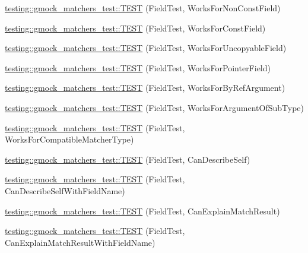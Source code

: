\begin{DoxyCompactItemize}
\item 
\mbox{\hyperlink{namespacetesting_1_1gmock__matchers__test_a57213a63527bbd66c024dd1cfafe92d1}{testing\+::gmock\+\_\+matchers\+\_\+test\+::\+T\+E\+ST}} (Field\+Test, Works\+For\+Non\+Const\+Field)
\item 
\mbox{\hyperlink{namespacetesting_1_1gmock__matchers__test_a065efc397a420d3dde87909b4a9a6285}{testing\+::gmock\+\_\+matchers\+\_\+test\+::\+T\+E\+ST}} (Field\+Test, Works\+For\+Const\+Field)
\item 
\mbox{\hyperlink{namespacetesting_1_1gmock__matchers__test_ac26d681f09865b0727ca32343d974907}{testing\+::gmock\+\_\+matchers\+\_\+test\+::\+T\+E\+ST}} (Field\+Test, Works\+For\+Uncopyable\+Field)
\item 
\mbox{\hyperlink{namespacetesting_1_1gmock__matchers__test_a56b1c75b98aaa5c9d3a6dec2d3ba30dc}{testing\+::gmock\+\_\+matchers\+\_\+test\+::\+T\+E\+ST}} (Field\+Test, Works\+For\+Pointer\+Field)
\item 
\mbox{\hyperlink{namespacetesting_1_1gmock__matchers__test_afcb890c159493e250477408a453b08d1}{testing\+::gmock\+\_\+matchers\+\_\+test\+::\+T\+E\+ST}} (Field\+Test, Works\+For\+By\+Ref\+Argument)
\item 
\mbox{\hyperlink{namespacetesting_1_1gmock__matchers__test_ae720452c3587433e26bea2ea7e91f8e6}{testing\+::gmock\+\_\+matchers\+\_\+test\+::\+T\+E\+ST}} (Field\+Test, Works\+For\+Argument\+Of\+Sub\+Type)
\item 
\mbox{\hyperlink{namespacetesting_1_1gmock__matchers__test_a27058ed7297742f08419bc5feb3ef687}{testing\+::gmock\+\_\+matchers\+\_\+test\+::\+T\+E\+ST}} (Field\+Test, Works\+For\+Compatible\+Matcher\+Type)
\item 
\mbox{\hyperlink{namespacetesting_1_1gmock__matchers__test_ac43583cb3c4221aa6bd0132c2cb3fed6}{testing\+::gmock\+\_\+matchers\+\_\+test\+::\+T\+E\+ST}} (Field\+Test, Can\+Describe\+Self)
\item 
\mbox{\hyperlink{namespacetesting_1_1gmock__matchers__test_a37d3ea6fde3a814c788ecddead6b9828}{testing\+::gmock\+\_\+matchers\+\_\+test\+::\+T\+E\+ST}} (Field\+Test, Can\+Describe\+Self\+With\+Field\+Name)
\item 
\mbox{\hyperlink{namespacetesting_1_1gmock__matchers__test_ae1279ce8e2a3a6c6f0d4dbe436c9da02}{testing\+::gmock\+\_\+matchers\+\_\+test\+::\+T\+E\+ST}} (Field\+Test, Can\+Explain\+Match\+Result)
\item 
\mbox{\hyperlink{namespacetesting_1_1gmock__matchers__test_aaeb4a7641ecabdb39710c56321000e47}{testing\+::gmock\+\_\+matchers\+\_\+test\+::\+T\+E\+ST}} (Field\+Test, Can\+Explain\+Match\+Result\+With\+Field\+Name)

\end{DoxyCompactItemize}
